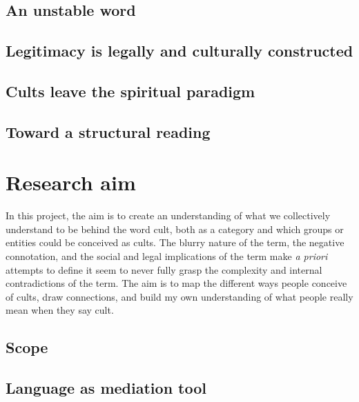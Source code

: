 \subsection{An unstable word}
\label{subsec:unstable_word}

\subsection{Legitimacy is legally and culturally constructed}
\label{subsec:legitimacy}

\subsection{Cults leave the spiritual paradigm}
\label{subsec:spiritual_paradigm}

\subsection{Toward a structural reading}
\label{subsec:structural_reading}

\section{Research aim}
In this project, the aim is to create an understanding of what we collectively understand to be behind the word cult, both as a category and which groups or entities could be conceived as cults. The blurry nature of the term, the negative connotation, and the social and legal implications of the term make \textit{a priori} attempts to define it seem to never fully grasp the complexity and internal contradictions of the term. The aim is to map the different ways people conceive of cults, draw connections, and build my own understanding of what people really mean when they say cult.

\subsection{Scope}
\label{subsec:scope}

\subsection{Language as mediation tool}

